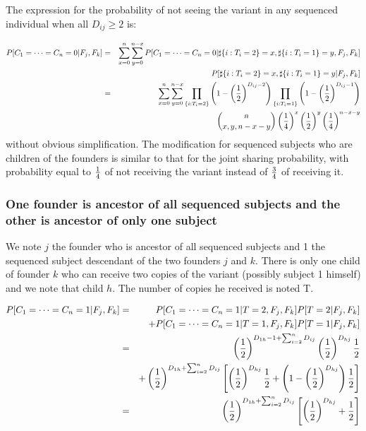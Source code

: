 \documentclass[12pt]{aastex}
\begin{document}
The expression for the probability of not seeing the variant in any sequenced individual when all $D_{ij} \geq 2$ is:

\begin{eqnarray}
P[C_1 = \dots = C_n = 0 | F_j, F_k] &=& \sum_{x=0}^n \sum_{y=0}^{n-x}  P[C_1 = \dots = C_n = 0 | \sharp \{ i : T_i = 2\} = x, \sharp \{ i : T_i = 1\} = y, F_j, F_k] \nonumber \\
& &  P[\sharp \{ i : T_i = 2\} = x, \sharp \{ i : T_i = 1\} = y| F_j, F_k]\\
&=& \sum_{x=0}^n \sum_{y=0}^{n-x} \prod_{\{ i : T_i = 2\}} \left( 1 - \left( {1 \over 2} \right)^{D_{ij}-2}\right) \prod_{\{ i : T_i = 1\}} \left( 1 - \left( {1 \over 2} \right)^{ D_{ij}-1}\right)  \nonumber \\
& &  {n \choose x,y,n-x-y} \left( {1 \over 4} \right)^x \left( {1 \over 2} \right)^y \left( {1 \over 4} \right)^{n-x-y} \nonumber
\end{eqnarray}
without obvious simplification. The modification for  sequenced subjects who are children of the founders is similar to that for the joint sharing probability, with probability equal to ${1 \over 4}$ of not receiving the variant instead of ${3 \over 4}$ of receiving it.

\subsubsection{One founder is ancestor of all sequenced subjects and the other is ancestor of only one subject}

We note $j$ the founder who is ancestor of all sequenced subjects and 1 the sequenced subject descendant of the two founders $j$ and $k$. There is only one child of founder $k$ who  can receive two copies of the variant (possibly subject 1 himself) and we note that child $h$. The number of copies he received is noted T.

\begin{eqnarray}
P[C_1 = \dots = C_n = 1 | F_j, F_k] &=& P[C_1 = \dots = C_n = 1 | T = 2, F_j, F_k] P[T = 2 | F_j, F_k]\\
& & + P[C_1 = \dots = C_n = 1 | T = 1, F_j, F_k] P[T = 1 | F_j, F_k]  \nonumber \\
&=& \left( {1 \over 2} \right)^{D_{1h}-1 + \sum_{i=2}^n D_{ij}} \left( {1 \over 2} \right)^{D_{hj}} {1 \over 2}  \nonumber \\
& & + \left( {1 \over 2} \right)^{D_{1h} + \sum_{i=2}^n D_{ij}} \left[ \left( {1 \over 2} \right)^{D_{hj}} {1 \over 2} + \left( 1 - \left( {1 \over 2} \right)^{D_{hj}} \right) {1 \over 2} \right] \nonumber \\
&=& \left( {1 \over 2} \right)^{D_{1h} + \sum_{i=2}^n D_{ij}} \left[ \left( {1 \over 2} \right)^{D_{hj}} + {1 \over 2} \right] \nonumber
\end{eqnarray}
\end{document}
